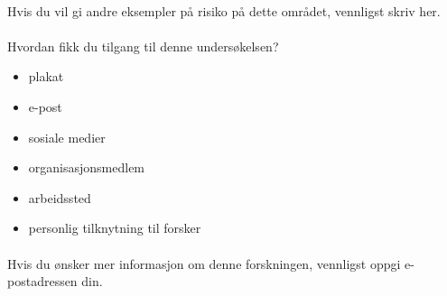\paragraph{}

Hvis du vil gi andre eksempler på risiko på dette området, vennligst skriv her.
\paragraph{}

Hvordan fikk du tilgang til denne undersøkelsen?
\begin{itemize}
    \item plakat
    \item e-post
    \item sosiale medier
    \item organisasjonsmedlem
    \item arbeidssted
    \item personlig tilknytning til forsker
\end{itemize}
\paragraph{}

Hvis du ønsker mer informasjon om denne forskningen, vennligst oppgi e-postadressen din.